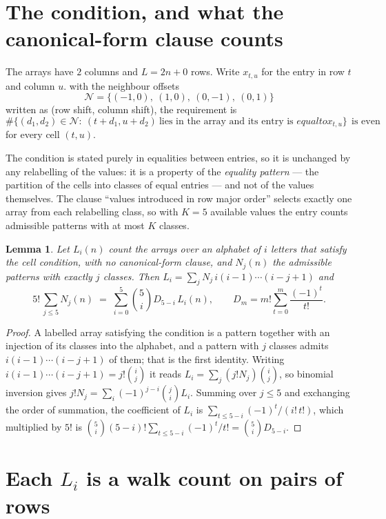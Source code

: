 \documentclass[11pt,a4paper]{article}
\theoremstyle{plain}
\newtheorem{lemma}[theorem]{Lemma}
\theoremstyle{definition}
\begin{document}
\section{The condition, and what the canonical-form clause counts}

The arrays have $2$ columns and $L=2n+0$ rows. Write $x_{t,u}$ for the entry in
row $t$ and column $u$. with the neighbour offsets
\[
\mathcal N=\{(-1,0),\ (1,0),\ (0,-1),\ (0,1)\}
\]
written as (row shift, column shift), the requirement is
\begin{equation}\label{eq:loc}
\#\bigl\{(d_1,d_2)\in\mathcal N:\ (t+d_1,u+d_2)\ \text{lies in the array and its entry is }
equal to x_{t,u}\bigr\}\ \ \text{is even}
\end{equation}
for every cell $(t,u)$.

The condition is stated purely in equalities between entries, so it is unchanged by any
relabelling of the values: it is a property of the \emph{equality pattern} --- the partition
of the cells into classes of equal entries --- and not of the values themselves. The clause
``values introduced in row major order'' selects exactly one array from each relabelling
class, so with $K=5$ available values the entry counts admissible patterns with at most $K$
classes.

\begin{lemma}\label{lem:inv}
Let $L_i(n)$ count the arrays over an alphabet of $i$ letters that satisfy the cell
condition, with no canonical-form clause, and $N_j(n)$ the admissible patterns with exactly
$j$ classes. Then $L_i=\sum_j N_j\,i(i-1)\cdots(i-j+1)$ and
\[
5!\,\sum_{j\le 5}N_j(n)\;=\;\sum_{i=0}^{5}\binom{5}{i}D_{5-i}\,L_i(n),
\qquad D_m=m!\sum_{t=0}^{m}\frac{(-1)^t}{t!} .
\]
\end{lemma}

\begin{proof}
A labelled array satisfying the condition is a pattern together with an injection of its
classes into the alphabet, and a pattern with $j$ classes admits $i(i-1)\cdots(i-j+1)$ of
them; that is the first identity. Writing $i(i-1)\cdots(i-j+1)=j!\binom{i}{j}$ it reads
$L_i=\sum_j(j!N_j)\binom{i}{j}$, so binomial inversion gives
$j!N_j=\sum_i(-1)^{j-i}\binom{j}{i}L_i$. Summing over $j\le5$ and exchanging the
order of summation, the coefficient of $L_i$ is
$\sum_{t\le5-i}(-1)^t/(i!\,t!)$, which multiplied by $5!$ is
$\binom{5}{i}(5-i)!\sum_{t\le5-i}(-1)^t/t!=\binom{5}{i}D_{5-i}$.
\end{proof}

\section{Each $L_i$ is a walk count on pairs of rows}
\end{document}
